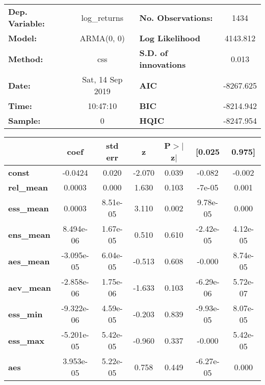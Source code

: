 \begin{center}
\begin{tabular}{lclc}
\toprule
\textbf{Dep. Variable:} &   log\_returns   & \textbf{  No. Observations:  } &    1434     \\
\textbf{Model:}         &    ARMA(0, 0)    & \textbf{  Log Likelihood     } &  4143.812   \\
\textbf{Method:}        &       css        & \textbf{  S.D. of innovations} &   0.013     \\
\textbf{Date:}          & Sat, 14 Sep 2019 & \textbf{  AIC                } & -8267.625   \\
\textbf{Time:}          &     10:47:10     & \textbf{  BIC                } & -8214.942   \\
\textbf{Sample:}        &        0         & \textbf{  HQIC               } & -8247.954   \\
\bottomrule
\end{tabular}
\begin{tabular}{lcccccc}
                   & \textbf{coef} & \textbf{std err} & \textbf{z} & \textbf{P$> |$z$|$} & \textbf{[0.025} & \textbf{0.975]}  \\
\midrule
\textbf{const}     &      -0.0424  &        0.020     &    -2.070  &         0.039        &       -0.082    &       -0.002     \\
\textbf{rel\_mean} &       0.0003  &        0.000     &     1.630  &         0.103        &       -7e-05    &        0.001     \\
\textbf{ess\_mean} &       0.0003  &     8.51e-05     &     3.110  &         0.002        &     9.78e-05    &        0.000     \\
\textbf{ens\_mean} &    8.494e-06  &     1.67e-05     &     0.510  &         0.610        &    -2.42e-05    &     4.12e-05     \\
\textbf{aes\_mean} &   -3.095e-05  &     6.04e-05     &    -0.513  &         0.608        &       -0.000    &     8.74e-05     \\
\textbf{aev\_mean} &   -2.858e-06  &     1.75e-06     &    -1.633  &         0.103        &    -6.29e-06    &     5.72e-07     \\
\textbf{ess\_min}  &   -9.322e-06  &     4.59e-05     &    -0.203  &         0.839        &    -9.93e-05    &     8.07e-05     \\
\textbf{ess\_max}  &   -5.201e-05  &     5.42e-05     &    -0.960  &         0.337        &       -0.000    &     5.42e-05     \\
\textbf{aes}       &    3.953e-05  &     5.22e-05     &     0.758  &         0.449        &    -6.27e-05    &        0.000     \\
\bottomrule
\end{tabular}
\end{center}

